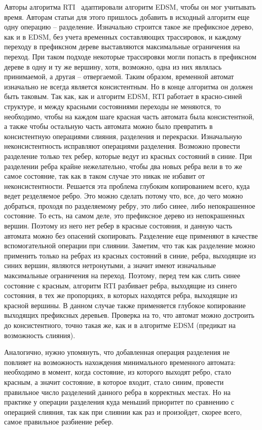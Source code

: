 \documentclass[times,specification,annotation]{itmo-student-thesis}
\begin{document}
Авторы алгоритма RTI~\cite{rti} адаптировали алгоритм EDSM, чтобы он мог учитывать время. Авторам статьи для этого пришлось добавить в исходный алгоритм еще одну операцию -- разделение.
Изначально строится такое же префиксное дерево, как и в EDSM, без учета временных составляющих трассировок, и каждому переходу в префиксном дереве выставляются максимальные ограничения на переход.
При таком подходе некоторые трассировки могли попасть в префиксном дереве в одну и ту же вершину, хотя, возможно, одна из них являлась принимаемой, а другая -- отвергаемой. Таким образом, временной
автомат изначально не всегда является консистентным. Но в конце алгоритма он должен быть таковым. Так как, как и алгоритм EDSM, RTI работает в красно-синей структуре, и между красными состояниями
переходы не меняются, то необходимо, чтобы на каждом шаге красная часть автомата была консистентной, а также чтобы остальную часть автомата можно было превратить в консистентную
операциями слияния, разделения и перекраски. Изначальную неконсистентность исправляют операциями разделения. Возможно провести разделение только тех ребер, которые ведут из красных состояний в синие. 
При разделении ребра крайне нежелательно, чтобы два новых ребра вели в то же самое состояние, так как в таком случае это никак не избавит от неконсистентности.
Решается эта проблема глубоким копированием всего, куда ведет резделяемое ребро. Это можно сделать потому что, все, до чего можно добраться, проходя по разделяемому ребру, это либо синее, либо
непокрашенное состояние. То есть, на самом деле, это префиксное дерево из непокрашенных вершин. Поэтому из него нет ребер в красные состояния, и данную часть автомата можно без опасений скопировать.
Разделение еще применяют в качестве вспомогательной операции при слиянии. Заметим, что так как разделение можно применить только на ребрах из красных состояний в синие, ребра, выходящие из синих
вершин, являются нетронутыми, а значит имеют изначальные максимальные ограничения на переход. Поэтому, перед тем как слить синее состояние с красным, алгоритм RTI разбивает ребра, 
выходящие из синего состояния, в тех же пропорциях, в которых находятся ребра, выходящие из красной вершины. В данном случае также применяется глубокое копирование выходящих префиксных деревьев.
Проверка на то, что автомат можно достроить до консистентного, точно такая же, как и в алгоритме EDSM (предикат на возможность слияния).

Аналогично, нужно упомянуть, что добавленная операция разделения не повлияет на возможность нахождения минимального временного автомата: необходимо в момент, когда состояние, из которого
выходят ребро, стало красным, а значит состояние, в которое входит, стало синим, провести правильное число разделений данного ребра в корректных местах. Но на практике у операции
разделения куда меньший приоритет по сравнению с операцией слияния, так как при слиянии как раз и произойдет, скорее всего, самое правильное разбиение ребер. 
\end{document}
